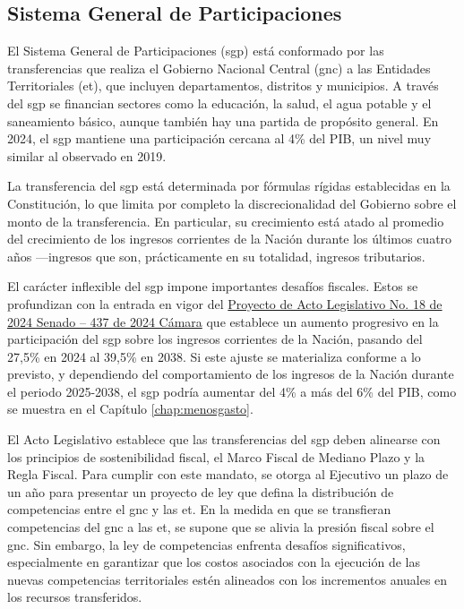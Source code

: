 \subsection{Sistema General de Participaciones}

El Sistema General de Participaciones (\gls{sgp}) está conformado por las transferencias que realiza el Gobierno Nacional Central (\gls{gnc}) a las Entidades Territoriales (\gls{et}), que incluyen departamentos, distritos y municipios. A través del \gls{sgp} se financian sectores como la educación, la salud, el agua potable y el saneamiento básico, aunque también hay una partida de propósito general. En 2024, el \gls{sgp} mantiene una participación cercana al 4\% del PIB, un nivel muy similar al observado en 2019.

La transferencia del \gls{sgp} está determinada por fórmulas rígidas establecidas en la Constitución, lo que limita por completo la discrecionalidad del Gobierno sobre el monto de la transferencia. En particular, su crecimiento está atado al promedio del crecimiento de los ingresos corrientes de la Nación durante los últimos cuatro años —ingresos que son, prácticamente en su totalidad, ingresos tributarios.

El carácter inflexible del \gls{sgp} impone importantes desafíos fiscales. Estos se profundizan con la entrada en vigor del \href{https://fecode.edu.co/wp-content/uploads/2024/11/T.-DEF.-PAL-18-24S-437-24C-SGP.pdf}{Proyecto de Acto Legislativo No. 18 de 2024 Senado – 437 de 2024 Cámara} que establece un aumento progresivo en la participación del \gls{sgp} sobre los ingresos corrientes de la Nación, pasando del 27,5\% en 2024 al 39,5\% en 2038. Si este ajuste se materializa conforme a lo previsto, y dependiendo del comportamiento de los ingresos de la Nación durante el periodo 2025-2038, el \gls{sgp} podría aumentar del 4\% a más del 6\% del PIB, como se muestra en el Capítulo \ref{chap:menosgasto}.

El Acto Legislativo establece que las transferencias del \gls{sgp} deben alinearse con los principios de sostenibilidad fiscal, el Marco Fiscal de Mediano Plazo y la Regla Fiscal. Para cumplir con este mandato, se otorga al Ejecutivo un plazo de un año para presentar un proyecto de ley que defina la distribución de competencias entre el \gls{gnc} y las \gls{et}. En la medida en que se transfieran competencias del \gls{gnc} a las \gls{et}, se supone que se alivia la presión fiscal sobre el \gls{gnc}. Sin embargo, la ley de competencias enfrenta desafíos significativos, especialmente en garantizar que los costos asociados con la ejecución de las nuevas competencias territoriales estén alineados con los incrementos anuales en los recursos transferidos.

